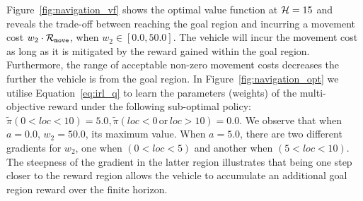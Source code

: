 Figure~\ref{fig:navigation_vf} shows the optimal value function at {\footnotesize$ \mathcal{H} = 15 $} and reveals the trade-off between reaching the goal region and incurring a movement cost {\footnotesize $w_2 \cdot \mathcal{R}_{\mathtt{move}}$}, when {\footnotesize $w_2 \in [0.0, 50.0]$}. The vehicle will incur the movement cost as long as it is mitigated by the reward gained within the goal region. Furthermore, the range of acceptable non-zero movement costs decreases the further the vehicle is from the goal region. 
In Figure~\ref{fig:navigation_opt} we utilise Equation~\eqref{eq:irl_q} to learn the parameters (weights) of the multi-objective reward under the following sub-optimal policy: {\footnotesize $ \tilde{\pi}(0 < loc < 10) = 5.0,  \tilde{\pi}(loc < 0 \,\mathrm{or}\, loc > 10) = 0.0$}. We observe that when {\footnotesize $a = 0.0$}, {\footnotesize $ w_2 = 50.0$}, its maximum value. When {\footnotesize $a = 5.0$}, there are two different gradients for {\footnotesize $ w_2 $}, one when {\footnotesize $ (0 < loc < 5) $} and another when {\footnotesize $ (5 < loc < 10) $}. The steepness of the gradient in the latter region illustrates that being one step closer to the reward region allows the vehicle to accumulate an additional goal region reward over the finite horizon.

